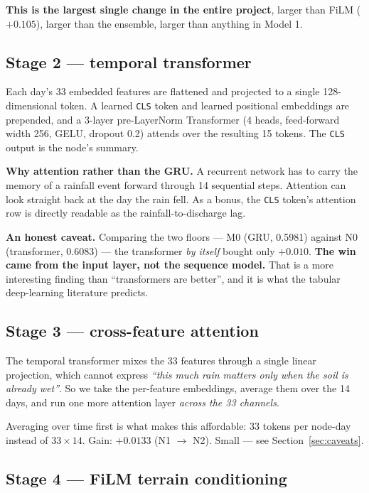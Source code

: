 \documentclass[11pt,a4paper]{article}
\begin{document}
\noindent
\textbf{This is the largest single change in the entire project}, larger than
FiLM ($+0.105$), larger than the ensemble, larger than anything in Model 1.

\subsection{Stage 2 --- temporal transformer}

Each day's 33 embedded features are flattened and projected to a single
128-dimensional token. A learned \texttt{CLS} token and learned positional
embeddings are prepended, and a 3-layer pre-LayerNorm Transformer (4 heads,
feed-forward width 256, GELU, dropout 0.2) attends over the resulting 15 tokens.
The \texttt{CLS} output is the node's summary.

\textbf{Why attention rather than the GRU.} A recurrent network has to carry the
memory of a rainfall event forward through 14 sequential steps. Attention can
look straight back at the day the rain fell. As a bonus, the \texttt{CLS}
token's attention row is directly readable as the rainfall-to-discharge lag.

\textbf{An honest caveat.} Comparing the two floors --- M0 (GRU, 0.5981) against
N0 (transformer, 0.6083) --- the transformer \emph{by itself} bought only
$+0.010$. \textbf{The win came from the input layer, not the sequence model.}
That is a more interesting finding than ``transformers are better'', and it is
what the tabular deep-learning literature predicts.

\subsection{Stage 3 --- cross-feature attention}

The temporal transformer mixes the 33 features through a single linear
projection, which cannot express \emph{``this much rain matters only when the
soil is already wet''}. So we take the per-feature embeddings, average them over
the 14 days, and run one more attention layer \emph{across the 33 channels}.

Averaging over time first is what makes this affordable: 33 tokens per node-day
instead of $33 \times 14$. Gain: $+0.0133$ (N1 $\to$ N2). Small --- see
Section~\ref{sec:caveats}.

\subsection{Stage 4 --- FiLM terrain conditioning}
\end{document}
